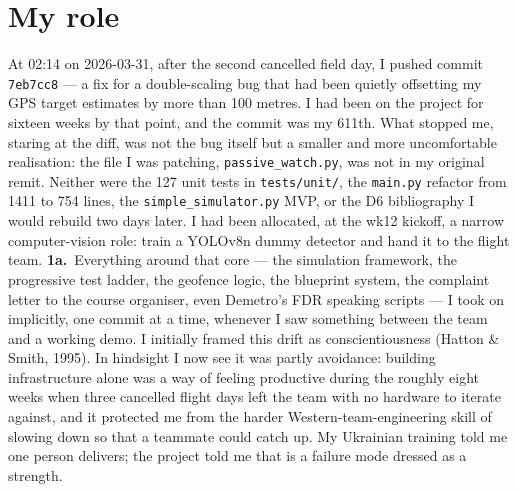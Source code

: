 \section{My role}

At 02:14 on 2026-03-31, after the second cancelled field day, I pushed commit \texttt{7eb7cc8} --- a fix for a double-scaling bug that had been quietly offsetting my GPS target estimates by more than 100 metres. I had been on the project for sixteen weeks by that point, and the commit was my 611th. What stopped me, staring at the diff, was not the bug itself but a smaller and more uncomfortable realisation: the file I was patching, \texttt{passive\_watch.py}, was not in my original remit. Neither were the 127 unit tests in \texttt{tests/unit/}, the \texttt{main.py} refactor from 1411 to 754 lines, the \texttt{simple\_simulator.py} MVP, or the D6 bibliography I would rebuild two days later. I had been allocated, at the wk12 kickoff, a narrow computer-vision role: train a YOLOv8n dummy detector and hand it to the flight team. \textbf{1a.}~Everything around that core --- the simulation framework, the progressive test ladder, the geofence logic, the blueprint system, the complaint letter to the course organiser, even Demetro's FDR speaking scripts --- I took on implicitly, one commit at a time, whenever I saw something between the team and a working demo. I initially framed this drift as conscientiousness (Hatton \& Smith, 1995). In hindsight I now see it was partly avoidance: building infrastructure alone was a way of feeling productive during the roughly eight weeks when three cancelled flight days left the team with no hardware to iterate against, and it protected me from the harder Western-team-engineering skill of slowing down so that a teammate could catch up. My Ukrainian training told me one person delivers; the project told me that is a failure mode dressed as a strength.

